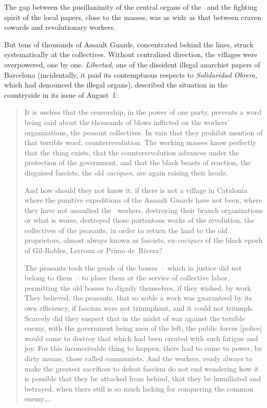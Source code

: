 The gap between the pusillanimity of the central organs of the \CNT\ and the fighting spirit of the local papers, close to the masses, was as wide as that between craven cowards and revolutionary workers.

But tens of thousands of Assault Guards, concentrated behind the lines, struck systematically at the collectives. Without centralized direction, the villages were overpowered, one by one. \emph{Libertad,} one of the dissident illegal anarchist papers of Barcelona (incidentally\kn, it paid its contemptuous respects to \emph{Solidaridad Obrera,} which had denounced the illegal organs), described the situation in the countryside in its issue of August~1:

\begin{quotation}
  It is useless that the censorship, in the power of one party, prevents a word being said about the thousands of blows inflicted on the workers’ organizations, the peasant collectives. In vain that they prohibit mention of that terrible word, counterrevolution. The working masses know perfectly that the thing exists, that the counterrevolution advances under the protection of the government, and that the black beasts of reaction, the disguised fascists, the old \emph{caciques,} are again raising their heads.
  
  And how should they not know it, if there is not a village in Catalonia where the punitive expeditions of the Assault Guards have not been, where they have not assaulted the \CNT\ workers, destroying their branch organizations or what is worse, destroyed those portentous works of the revolution, the collectives of the peasants, in order to return the land to the old proprietors, almost always known as fascists, ex-\emph{caciques} of the black epoch of Gil-Robles, Lerroux or Primo de~Rivera?
  
  The peasants took the goods of the bosses~-- which in justice did not belong to them~-- to place them at the service of collective labor, permitting the old bosses to dignify themselves, if they wished, by work. They believed, the peasants, that so noble a work was guaranteed by its own efficiency, if fascism were not triumphant, and it could not triumph. Scarcely did they suspect that in the midst of war against the terrible enemy, with the government being men of the left, the public forces [police] would come to destroy that which had been created with such fatigue and joy. For this inconceivable thing to happen, there had to come to power\kn, by dirty means, those called communists. And the workers, ready always to make the greatest sacrifices to defeat fascism do not end wondering how it is possible that they be attacked from behind, that they be humiliated and betrayed, when there still is so much lacking for conquering the common enemy\dots.
  

\end{quotation}

